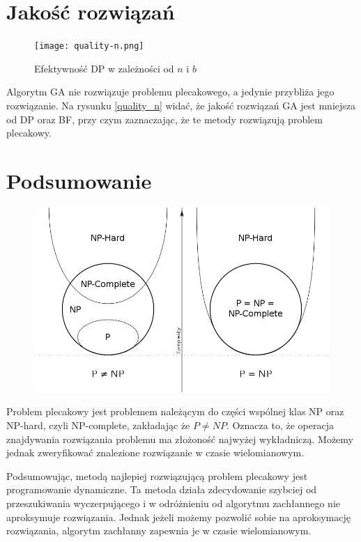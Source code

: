 \documentclass[11pt,twocolumn]{article}
\begin{document}
\section{Jakość rozwiązań}

\begin{figure}[h]
	\texttt{[image: quality-n.png]}
	\caption{Efektywność DP w zależności od $n$ i $b$ \label{speed_bn}}
\end{figure}

Algorytm GA nie rozwiązuje problemu plecakowego, a jedynie przybliża jego rozwiązanie.
Na rysunku \ref{quality_n} widać, że jakość rozwiązań GA jest mniejsza od DP oraz BF,
przy czym zaznaczając, że te metody rozwiązują problem plecakowy.

\section{Podsumowanie}

\begin{figure}[h!]
	\includegraphics[width=\linewidth]{pnp.png}
\end{figure}

Problem plecakowy jest problemem należącym do części wspólnej klas NP oraz NP-hard, czyli NP-complete, zakładając że $P \neq NP$.
Oznacza to, że operacja znajdywania rozwiązania problemu ma złożoność najwyżej wykładniczą.
Możemy jednak zweryfikować znalezione rozwiązanie w czasie wielomianowym.

Podsumowując, metodą najlepiej rozwiązującą problem plecakowy
jest programowanie dynamiczne. Ta metoda działa zdecydowanie szybciej od
przeszukiwania wyczerpującego i w odróżnieniu od algorytmu zachłannego
nie aproksymuje rozwiązania.
Jednak jeżeli możemy pozwolić sobie na aproksymację rozwiązania,
algorytm zachłanny zapewnia je w czasie wielomianowym.
\end{document}
